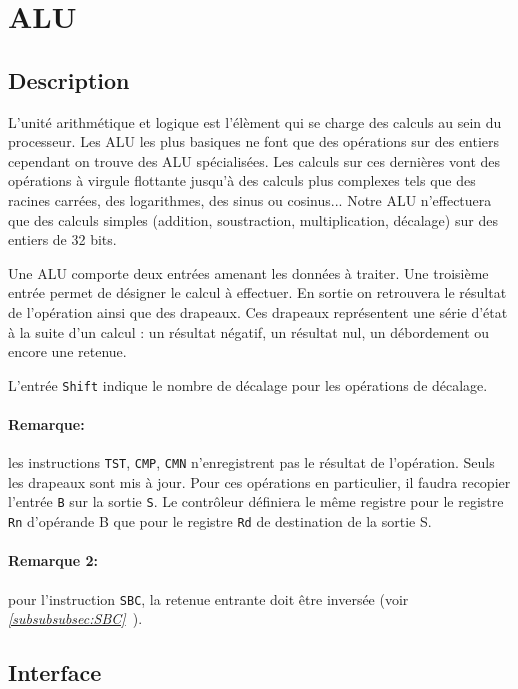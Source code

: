 \documentclass{article}
\begin{document}
    \section{ALU}
    \label{sec:ALU}

    \subsection{Description}

    L'unité arithmétique et logique est l'élèment qui se charge des calculs au sein du processeur.
    Les ALU les plus basiques ne font que des opérations sur des entiers cependant on trouve des ALU spécialisées.
    Les calculs sur ces dernières vont des opérations à virgule flottante jusqu'à des calculs plus complexes tels que des racines carrées, des logarithmes, des sinus ou cosinus... Notre ALU n'effectuera que des calculs simples (addition, soustraction, multiplication, décalage) sur des entiers de 32 bits.

    Une ALU comporte deux entrées amenant les données à traiter.
    Une troisième entrée permet de désigner le calcul à effectuer.
    En sortie on retrouvera le résultat de l'opération ainsi que des drapeaux.
    Ces drapeaux représentent une série d'état à la suite d'un calcul : un résultat négatif, un résultat nul, un débordement ou encore une retenue.

    L'entrée \texttt{Shift} indique le nombre de décalage pour les opérations de décalage.

    \paragraph{Remarque:} les instructions \texttt{TST}, \texttt{CMP}, \texttt{CMN} n'enregistrent pas le résultat de l'opération.
    Seuls les drapeaux sont mis à jour.
    Pour ces opérations en particulier, il faudra recopier l'entrée \texttt{B} sur la sortie \texttt{S}.
    Le contrôleur définiera le même registre pour le registre \texttt{Rn} d'opérande B que pour le registre \texttt{Rd} de destination de la sortie S.

    \paragraph{Remarque 2:} pour l'instruction \texttt{SBC}, la retenue entrante doit être inversée (voir \textit{\ref{subsubsubsec:SBC}~}).

    \subsection{Interface}
\end{document}
